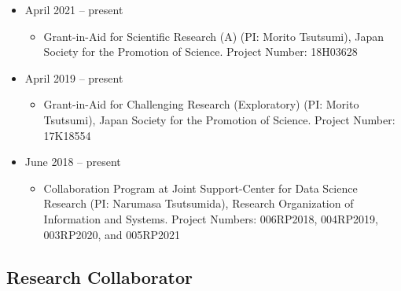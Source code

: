 \documentclass[
]{book}
\providecommand{\tightlist}{%
  \setlength{\itemsep}{0pt}\setlength{\parskip}{0pt}}
\begin{document}
\begin{itemize}
\tightlist
\item
  April 2021 -- present

  \begin{itemize}
  \tightlist
  \item
    Grant-in-Aid for Scientific Research (A) (PI: Morito Tsutsumi),
    Japan Society for the Promotion of Science.
    Project Number: 18H03628
  \end{itemize}
\item
  April 2019 -- present

  \begin{itemize}
  \tightlist
  \item
    Grant-in-Aid for Challenging Research (Exploratory) (PI: Morito Tsutsumi),
    Japan Society for the Promotion of Science.
    Project Number: 17K18554
  \end{itemize}
\item
  June 2018 -- present

  \begin{itemize}
  \tightlist
  \item
    Collaboration Program at Joint Support-Center for Data Science Research (PI: Narumasa Tsutsumida),
    Research Organization of Information and Systems.
    Project Numbers: 006RP2018, 004RP2019, 003RP2020, and 005RP2021
  \end{itemize}
\end{itemize}

\hypertarget{research-collaborator}{%
\subsection*{Research Collaborator}\label{research-collaborator}}
\end{document}
